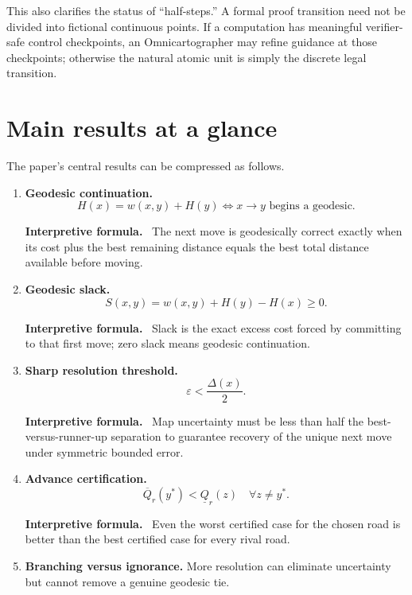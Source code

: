 \documentclass[11pt]{article}
\theoremstyle{definition}
\theoremstyle{remark}
\newcommand{\Qval}{Q}
\newcommand{\Gap}{\Delta}
\newcommand{\Slack}{S}
\newcommand{\eps}{\varepsilon}
\newenvironment{interpretiveformula}{%
  \begin{center}\begin{minipage}{0.92\textwidth}\small
  \textbf{Interpretive formula.}\ }{\end{minipage}\end{center}}
\begin{document}
This also clarifies the status of ``half-steps.'' A formal proof transition need not be divided into fictional continuous points. If a computation has meaningful verifier-safe control checkpoints, an Omnicartographer may refine guidance at those checkpoints; otherwise the natural atomic unit is simply the discrete legal transition.

\section{Main results at a glance}
The paper's central results can be compressed as follows.

\begin{enumerate}
\item \textbf{Geodesic continuation.}
\[
H(x)=w(x,y)+H(y)
\iff
x\to y\text{ begins a geodesic.}
\]
\begin{interpretiveformula}
The next move is geodesically correct exactly when its cost plus the best remaining distance equals the best total distance available before moving.
\end{interpretiveformula}

\item \textbf{Geodesic slack.}
\[
\Slack(x,y)=w(x,y)+H(y)-H(x)\ge0.
\]
\begin{interpretiveformula}
Slack is the exact excess cost forced by committing to that first move; zero slack means geodesic continuation.
\end{interpretiveformula}

\item \textbf{Sharp resolution threshold.}
\[
\eps<\frac{\Gap(x)}2.
\]
\begin{interpretiveformula}
Map uncertainty must be less than half the best-versus-runner-up separation to guarantee recovery of the unique next move under symmetric bounded error.
\end{interpretiveformula}

\item \textbf{Advance certification.}
\[
\overline{\Qval}_r(y^*)<\underline{\Qval}_r(z)\quad\forall z\neq y^*.
\]
\begin{interpretiveformula}
Even the worst certified case for the chosen road is better than the best certified case for every rival road.
\end{interpretiveformula}

\item \textbf{Branching versus ignorance.}
More resolution can eliminate uncertainty but cannot remove a genuine geodesic tie.


\end{enumerate}
\end{document}
